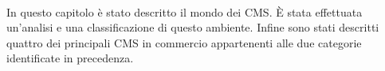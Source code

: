 \paragraph{}
In questo capitolo è stato descritto il mondo dei CMS. È stata effettuata un'analisi e una classificazione di questo ambiente. Infine sono stati descritti quattro dei principali CMS in commercio appartenenti alle due categorie identificate in precedenza.